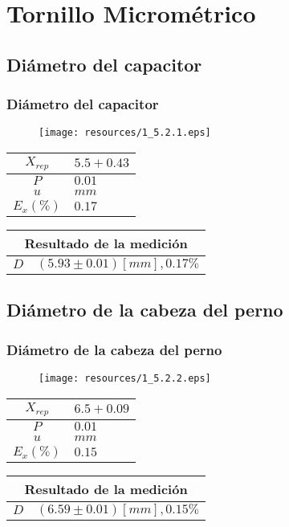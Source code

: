 \documentclass[letter,11pt]{beamer}
\begin{document}
\section{Tornillo Micrométrico}

\subsection{Diámetro del capacitor}
\begin{frame}
\frametitle{Diámetro del capacitor}
\vspace*{0.8cm}
\begin{figure}
\centering
\texttt{[image: resources/1\_5.2.1.eps]}
\end{figure}
\vspace*{0.4cm}
\scriptsize
\begin{tabular}{|c|>{\centering}m{1.8cm}<{\centering}|}
\hline
$X_{rep}$ &  $5.5+0.43$ \tabularnewline \hline
      $P$ &      $0.01$ \tabularnewline \hline
      $u$ &        $mm$ \tabularnewline \hline
$E_x(\%)$ &      $0.17$ \tabularnewline \hline
\end{tabular}
\quad
\begin{tabular}{|c|>{\centering}m{5.7cm}<{\centering}|}
\hline
\multicolumn{2}{|c|}{\textbf{Resultado de la medición}} \\ \hline
$D$ & $( 5.93\pm0.01)[mm], 0.17\%$ \tabularnewline \hline
\end{tabular}
\end{frame}

\subsection{Diámetro de la cabeza del perno}
\begin{frame}
\frametitle{Diámetro de la cabeza del perno}
\vspace*{0.8cm}
\begin{figure}
\centering
\texttt{[image: resources/1\_5.2.2.eps]}
\end{figure}
\vspace*{0.4cm}
\scriptsize
\begin{tabular}{|c|>{\centering}m{1.8cm}<{\centering}|}
\hline
$X_{rep}$ &  $6.5+0.09$ \tabularnewline \hline
      $P$ &      $0.01$ \tabularnewline \hline
      $u$ &        $mm$ \tabularnewline \hline
$E_x(\%)$ &      $0.15$ \tabularnewline \hline
\end{tabular}
\quad
\begin{tabular}{|c|>{\centering}m{5.7cm}<{\centering}|}
\hline
\multicolumn{2}{|c|}{\textbf{Resultado de la medición}} \\ \hline
$D$ & $( 6.59\pm0.01)[mm], 0.15\%$ \tabularnewline \hline
\end{tabular}
\end{frame}
\end{document}

